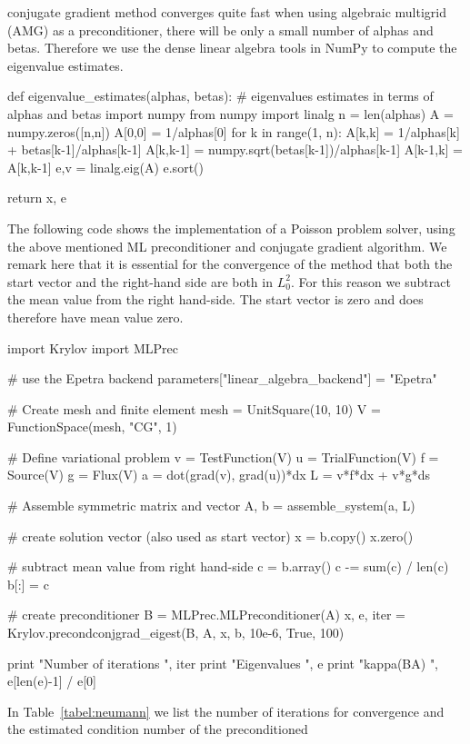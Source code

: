 conjugate gradient method converges quite fast when using algebraic
multigrid (AMG) as a preconditioner, there will be only a
small number of alphas and betas. Therefore we use the dense linear
algebra tools in NumPy to compute the eigenvalue estimates.
\begin{python}
def eigenvalue_estimates(alphas, betas):
    # eigenvalues estimates in terms of alphas and betas
    import numpy
    from numpy import linalg
    n = len(alphas)
    A = numpy.zeros([n,n])
    A[0,0] = 1/alphas[0]
    for k in range(1, n):
        A[k,k] = 1/alphas[k] + betas[k-1]/alphas[k-1]
        A[k,k-1] = numpy.sqrt(betas[k-1])/alphas[k-1]
        A[k-1,k] = A[k,k-1]
    e,v = linalg.eig(A)
    e.sort()

    return x, e
\end{python}
The following code shows the implementation of a Poisson problem
solver, using the above mentioned ML preconditioner and conjugate
gradient algorithm. We remark here that it is essential for the
convergence of the method that both the start vector and the
right-hand side are both in $L^2_0$. For this reason we subtract the
mean value from the right hand-side.  The start vector is zero and
does therefore have mean value zero.
\begin{python}
import Krylov
import MLPrec

# use the Epetra backend
parameters["linear_algebra_backend"] = "Epetra"

# Create mesh and finite element
mesh = UnitSquare(10, 10)
V = FunctionSpace(mesh, "CG", 1)

# Define variational problem
v = TestFunction(V)
u = TrialFunction(V)
f = Source(V)
g = Flux(V)
a = dot(grad(v), grad(u))*dx
L = v*f*dx + v*g*ds

# Assemble symmetric matrix and vector
A, b = assemble_system(a, L)

# create solution vector (also used as start vector)
x = b.copy()
x.zero()

# subtract mean value from right hand-side
c = b.array()
c -= sum(c) / len(c)
b[:] = c

# create preconditioner
B = MLPrec.MLPreconditioner(A)
x, e, iter = Krylov.precondconjgrad_eigest(B, A, x, b, 10e-6, True, 100)

print "Number of iterations ", iter
print "Eigenvalues ", e
print "kappa(BA) ", e[len(e)-1] / e[0]
\end{python}
In Table~\ref{tabel:neumann} we list the number of iterations for
convergence and the estimated condition number of the preconditioned
